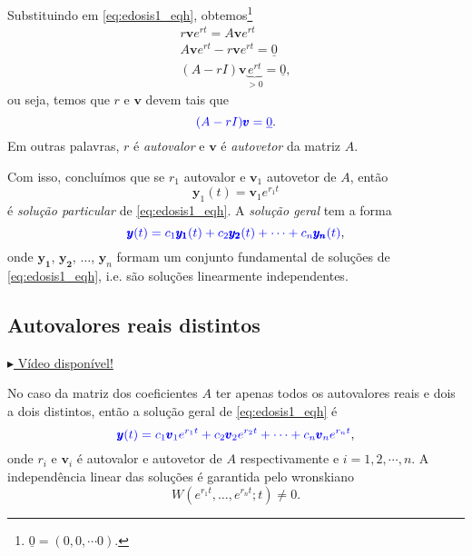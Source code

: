 Substituindo em \eqref{eq:edosis1_eqh}, obtemos\footnote{$\underline{0} = (0, 0, \cdots 0)$.}
\begin{gather}
  r\pmb{v}e^{rt} = A\pmb{v}e^{rt} \\
  A\pmb{v}e^{rt} - r\pmb{v}e^{rt} = \underline{0} \\
  (A - rI)\pmb{v}\underbrace{e^{rt}}_{>0} = \underline{0},
\end{gather}
ou seja, temos que $r$ e $\pmb{v}$ devem tais que
\begin{equation}\label{eq:edosis1_eqc}
  {\color{blue}(A - rI)\pmb{v} = \underline{0}}.
\end{equation}
Em outras palavras, $r$ é \emph{autovalor} e $\pmb{v}$ é \emph{autovetor} da matriz $A$.

Com isso, concluímos que se $r_1$ autovalor e $\pmb{v}_1$ autovetor de $A$, então
\begin{equation}
  \pmb{y}_1(t) = \pmb{v}_1e^{r_1t}
\end{equation}
é \emph{solução particular} de \eqref{eq:edosis1_eqh}. A \emph{solução geral} tem a forma
\begin{equation}
  {\color{blue}\pmb{y}(t) = c_1\pmb{y_1}(t) + c_2\pmb{y_2}(t) + \cdots + c_n\pmb{y_n}(t)},
\end{equation}
onde $\pmb{y_1}$, $\pmb{y_2}$, $\dotsc$, $\pmb{y}_n$ formam um conjunto fundamental de soluções de \eqref{eq:edosis1_eqh}, i.e. são soluções linearmente independentes.

\subsection{Autovalores reais distintos}

\begin{flushright}
  \href{https://archive.org/details/sistema-edos-autovalores-distintos}{$\blacktriangleright$ Vídeo disponível!}
\end{flushright}

No caso da matriz dos coeficientes $A$ ter apenas todos os autovalores reais e dois a dois distintos, então a solução geral de \eqref{eq:edosis1_eqh} é
\begin{equation}
  {\color{blue}\pmb{y}(t) = c_1\pmb{v}_1e^{r_1t}+c_2\pmb{v}_2e^{r_2t}+\cdots + c_n\pmb{v}_ne^{r_nt}},
\end{equation}
onde $r_i$ e $\pmb{v}_i$ é autovalor e autovetor de $A$ respectivamente e $i=1, 2, \cdots, n$. A independência linear das soluções é garantida pelo wronskiano
\begin{equation}
  W(e^{r_1t}, \dotsc, e^{r_nt};t)\neq 0.
\end{equation}

